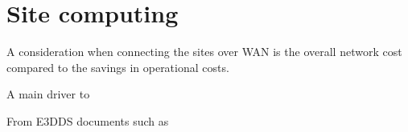 \documentclass[12pt,a4paper]{article}
\begin{document}
\section{Site computing}
\label{sec:site-comp}

A consideration when connecting the \ED sites over WAN is the overall network cost compared to the savings in operational costs.

A main driver to 

From E3DDS documents such as~\cite{}



\newpage
{}

\end{document}
